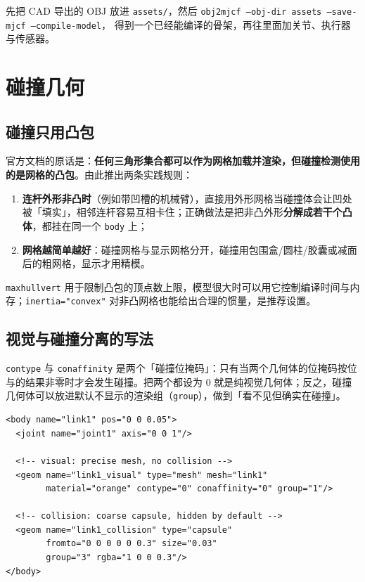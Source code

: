 \begin{tipbox}[典型用法]
	先把 CAD 导出的 OBJ 放进 \texttt{assets/}，然后
	\texttt{obj2mjcf --obj-dir assets --save-mjcf --compile-model}，
	得到一个已经能编译的骨架，再往里面加关节、执行器与传感器。
\end{tipbox}

\section{碰撞几何}

\subsection{碰撞只用凸包}

官方文档的原话是：\textbf{任何三角形集合都可以作为网格加载并渲染，但碰撞检测使用的是网格的凸包}。由此推出两条实践规则：

\begin{enumerate}
	\item \textbf{连杆外形非凸时}（例如带凹槽的机械臂），直接用外形网格当碰撞体会让凹处被「填实」，相邻连杆容易互相卡住；正确做法是把非凸外形\textbf{分解成若干个凸体}，都挂在同一个 \texttt{body} 上；
	\item \textbf{网格越简单越好}：碰撞网格与显示网格分开，碰撞用包围盒/圆柱/胶囊或减面后的粗网格，显示才用精模。
\end{enumerate}

\texttt{maxhullvert} 用于限制凸包的顶点数上限，模型很大时可以用它控制编译时间与内存；\texttt{inertia=\allowbreak"convex"} 对非凸网格也能给出合理的惯量，是推荐设置。

\subsection{视觉与碰撞分离的写法}

\texttt{contype} 与 \texttt{conaffinity} 是两个「碰撞位掩码」：只有当两个几何体的位掩码按位与的结果非零时才会发生碰撞。把两个都设为 $0$ 就是纯视觉几何体；反之，碰撞几何体可以放进默认不显示的渲染组（\texttt{group}），做到「看不见但确实在碰撞」。

\begin{lstlisting}[style=xml]
<body name="link1" pos="0 0 0.05">
  <joint name="joint1" axis="0 0 1"/>

  <!-- visual: precise mesh, no collision -->
  <geom name="link1_visual" type="mesh" mesh="link1"
        material="orange" contype="0" conaffinity="0" group="1"/>

  <!-- collision: coarse capsule, hidden by default -->
  <geom name="link1_collision" type="capsule"
        fromto="0 0 0 0 0 0.3" size="0.03"
        group="3" rgba="1 0 0 0.3"/>
</body>
\end{lstlisting}

